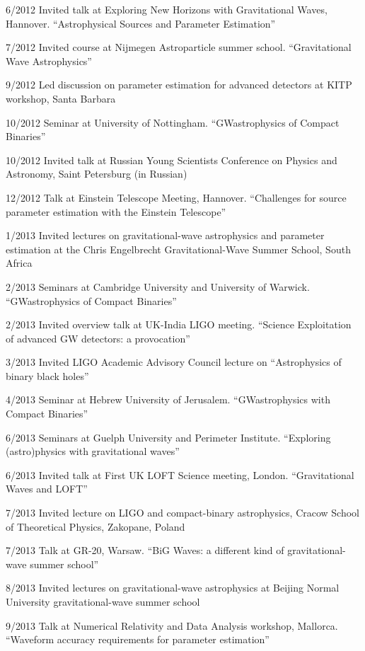 \documentclass[margin,line]{res}
\begin{document}
\begin{resume}
6/2012 	Invited talk at Exploring New Horizons with Gravitational Waves, Hannover.   ``Astrophysical Sources and Parameter Estimation''

7/2012	Invited course at Nijmegen Astroparticle summer school.  ``Gravitational Wave Astrophysics''

9/2012	Led discussion on parameter estimation for advanced detectors at KITP workshop, Santa Barbara

10/2012	Seminar at University of Nottingham.  ``GWastrophysics of Compact Binaries'' 

10/2012	Invited talk at Russian Young Scientists Conference on Physics and Astronomy, Saint Petersburg (in Russian)

12/2012	Talk at Einstein Telescope Meeting, Hannover.  ``Challenges for source parameter estimation with the Einstein Telescope''

1/2013 	Invited lectures on gravitational-wave astrophysics and parameter estimation at the Chris Engelbrecht Gravitational-Wave Summer School, South Africa

2/2013	Seminars at Cambridge University and University of Warwick.  ``GWastrophysics of Compact Binaries'' 

2/2013	Invited overview talk at UK-India LIGO meeting.  ``Science Exploitation of advanced GW detectors: a provocation''

3/2013	Invited LIGO Academic Advisory Council lecture on ``Astrophysics of binary black holes''

4/2013 	Seminar at Hebrew University of Jerusalem.  ``GWastrophysics with Compact Binaries'' 

6/2013	Seminars at Guelph University and Perimeter Institute.  ``Exploring (astro)physics with gravitational waves''

6/2013	Invited talk at First UK LOFT Science meeting, London.  ``Gravitational Waves 
and LOFT''

7/2013	Invited lecture on LIGO and compact-binary astrophysics, Cracow School of Theoretical Physics, Zakopane, Poland

7/2013	Talk at GR-20, Warsaw.  ``BiG Waves: a different kind of gravitational-wave summer school''
 
8/2013	Invited lectures on gravitational-wave astrophysics at Beijing Normal University gravitational-wave summer school
 
9/2013 	Talk at Numerical Relativity and Data Analysis workshop, Mallorca. ``Waveform accuracy requirements for parameter estimation''


\end{resume}
\end{document}
